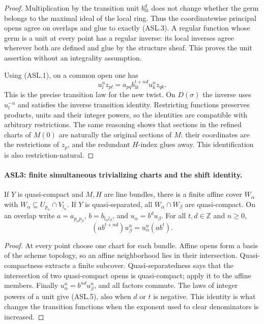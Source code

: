 \documentclass[11pt,a4paper]{article}
\numberwithin{equation}{section}
\theoremstyle{remark}\newtheorem{remark}[theorem]{Remark}
\begin{document}
\begin{proof}
Multiplication by the transition unit $b_{lk}^d$ does not change
whether the germ belongs to the maximal ideal of the local ring.
Thus the coordinatewise principal opens agree on overlaps and glue
to exactly (ASL.3).  A regular function whose germ is a unit at every
point has a regular inverse: its local inverses agree wherever both
are defined and glue by the structure sheaf.  This proves the unit
assertion without an integrality assumption.

Using (ASL.1), on a common open one has
\[
 u_l^nz_{pl}
 =a_{pq}b_{lk}^{t+nd}u_k^nz_{qk}.                 \tag{ASL.4}
\]
This is the precise transition law for the new twist.  On
$D(\sigma)$ the inverse uses $u_l^{-n}$ and satisfies the inverse
transition identity.  Restricting functions preserves products,
units and their integer powers, so the identities are compatible
with arbitrary restrictions.  The same reasoning shows that
sections in the refined charts of $M(0)$ are naturally the original
sections of $M$: their coordinates are the restrictions of $z_p$,
and the redundant $H$-index glues away.  This identification is also
restriction-natural.
\end{proof}

\paragraph{ASL3: finite simultaneous trivializing charts and the shift identity.}
\label{claim:ASL3}
If $Y$ is quasi-compact and $M,H$ are line bundles, there is a
finite affine cover $W_\alpha$ with
$W_\alpha\subseteq U_{p_\alpha}\cap V_{l_\alpha}$.
If $Y$ is quasi-separated, all $W_\alpha\cap W_\beta$ are
quasi-compact.  On an overlap write $a=a_{p_\alpha p_\beta}$,
$b=b_{l_\alpha l_\beta}$, and $u_\alpha=b^du_\beta$.
For all $t,d\in\mathbb Z$ and $n\ge0$,
\[
 (ab^{t+nd})u_\beta^n=u_\alpha^n(ab^t).          \tag{ASL.5}
\]

\begin{proof}
At every point choose one chart for each bundle.  Affine opens
form a basis of the scheme topology, so an affine neighborhood
lies in their intersection.  Quasi-compactness extracts a finite
subcover.  Quasi-separatedness says that the intersection of
two quasi-compact opens is quasi-compact; apply it to the affine
members.  Finally $u_\alpha^n=b^{nd}u_\beta^n$, and all factors
commute.  The laws of integer powers of a unit give (ASL.5), also
when $d$ or $t$ is negative.  This identity is what changes the
transition functions when the exponent used to clear denominators
is increased.
\end{proof}
\end{document}
